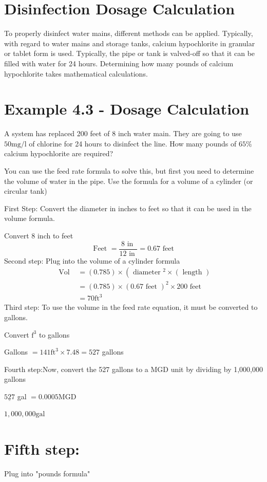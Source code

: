 \documentclass[10pt]{article}
\begin{document}
\section{Disinfection Dosage Calculation}
To properly disinfect water mains, different methods can be applied. Typically, with regard to water mains and storage tanks, calcium hypochlorite in granular or tablet form is used. Typically, the pipe or tank is valved-off so that it can be filled with water for 24 hours. Determining how many pounds of calcium hypochlorite takes mathematical calculations.

\section{Example 4.3 - Dosage Calculation}
A system has replaced 200 feet of 8 inch water main. They are going to use $50 \mathrm{mg} / \mathrm{l}$ of chlorine for 24 hours to disinfect the line. How many pounds of $65 \%$ calcium hypochlorite are required?

You can use the feed rate formula to solve this, but first you need to determine the volume of water in the pipe. Use the formula for a volume of a cylinder (or circular tank)

First Step: Convert the diameter in inches to feet so that it can be used in the volume formula.

Convert 8 inch to feet
$$
\text { Feet }=\frac{8 \text { in }}{12 \text { in }}=0.67 \text { feet }
$$
Second step: Plug into the volume of a cylinder formula
$$
\begin{aligned}
\text { Vol } &=(0.785) \times\left(\text { diameter }{ }^{2} \times(\text { length })\right.\\
&=(0.785) \times(0.67 \text { feet })^{2} \times 200 \text { feet } \\
&=70 \mathrm{ft}^{3}
\end{aligned}
$$
Third step: To use the volume in the feed rate equation, it must be converted to gallons.

Convert $\mathrm{f}^{3}$ to gallons

Gallons $=141 \mathrm{ft}^{3} \times 7.48=527$ gallons

Fourth step:Now, convert the 527 gallons to a MGD unit by dividing by 1,000,000 gallons

$\underline{527}$ gal $=0.0005 \mathrm{MGD}$

$1,000,000 \mathrm{gal}$

\section{Fifth step:}
Plug into "pounds formula"
\end{document}
